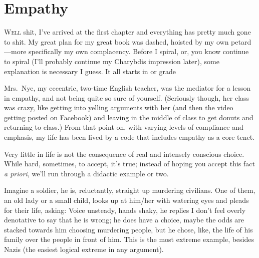 \documentclass[../butidigress.tex]{subfiles}
\begin{document}
\chapter{Empathy}\label{chap:empathy}
\newpage

\lettrine{W}{ell} shit, I've arrived at the first chapter and everything has pretty much gone to shit.
My great plan for my great book was dashed, hoisted by my own petard---more specifically my own complacency.
Before I spiral, or, you know continue to spiral (I'll probably continue my Charybdis impression later), some explanation is necessary I guess.
It all starts in  or  grade\lips{}

Mrs.\ Nye, my eccentric, two-time English teacher, was the mediator for a lesson in empathy, and not being quite so sure of yourself.
(Seriously though, her class was crazy, like getting into yelling arguments with her (and then the video getting posted on Facebook) and leaving in the middle of class to get donuts and returning to class.)
From that point on, with varying levels of compliance and emphasis, my life has been lived by a code that includes empathy as a core tenet.

Very little in life is not the consequence of real and intensely conscious choice.
While hard, sometimes, to accept, it's true; instead of hoping you accept this fact \textit{a priori}, we'll run through a didactic example or two.

Imagine a soldier, he is, reluctantly, straight up murdering civilians.
One of them, an old lady or a small child, looks up at him/her with watering eyes and pleads for their life, asking: 
Voice unsteady, hands shaky, he replies 
I don't feel overly denotative to say that he is wrong; he does have a choice, maybe the odds are stacked towards him choosing murdering people, but he chose, like, the life of his family over the people in front of him.
This is the most extreme example, besides Nazis (the easiest logical extreme in any argument).
\end{document}
